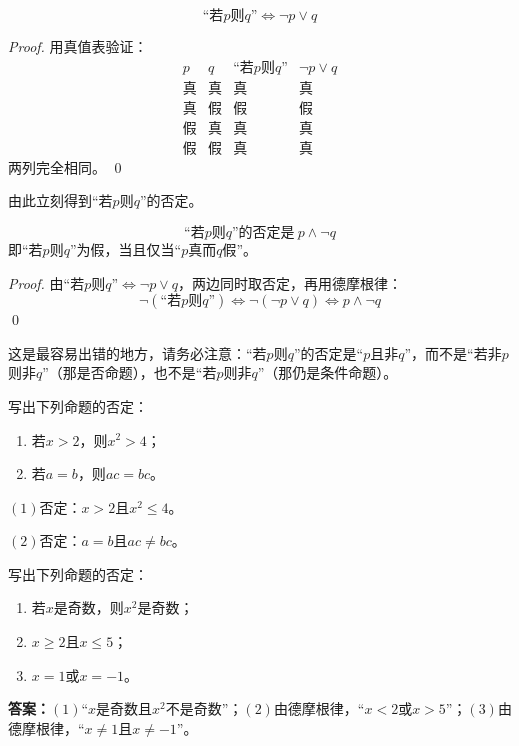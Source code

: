 \begin{theorem}[“若$p$则$q$”的改写]
\[
\text{“若}p\text{则}q\text{”}\iff \neg p\lor q
\]
\end{theorem}
\begin{proof}
用真值表验证：
\[
\begin{array}{c|c||c|c}
p & q & \text{“若}p\text{则}q\text{”} & \neg p\lor q\\\hline
\text{真} & \text{真} & \text{真} & \text{真}\\
\text{真} & \text{假} & \text{假} & \text{假}\\
\text{假} & \text{真} & \text{真} & \text{真}\\
\text{假} & \text{假} & \text{真} & \text{真}
\end{array}
\]
两列完全相同。
\qed
\end{proof}

由此立刻得到“若$p$则$q$”的否定。

\begin{corollary}[“若$p$则$q$”的否定]
\[
\text{“若}p\text{则}q\text{”的否定是}\ p\land\neg q
\]
即“若$p$则$q$”为假，当且仅当“$p$真而$q$假”。
\end{corollary}
\begin{proof}
由“若$p$则$q$”$\iff\neg p\lor q$，两边同时取否定，再用德摩根律：
\[\neg(\text{“若}p\text{则}q\text{”})\iff\neg(\neg p\lor q)\iff p\land\neg q\]
\qed
\end{proof}

这是最容易出错的地方，请务必注意：“若$p$则$q$”的否定是“$p$且非$q$”，而不是“若非$p$则非$q$”（那是否命题），也不是“若$p$则非$q$”（那仍是条件命题）。

\begin{example}
写出下列命题的否定：
\begin{enumerate}
    \item 若$x>2$，则$x^2>4$；
    \item 若$a=b$，则$ac=bc$。
\end{enumerate}
\end{example}
\begin{jie}
    $(1)$否定：$x>2$且$x^2\leq 4$。

    $(2)$否定：$a=b$且$ac\neq bc$。
\end{jie}

\begin{exercise}
写出下列命题的否定：
\begin{enumerate}
    \item 若$x$是奇数，则$x^2$是奇数；
    \item $x\geq 2$且$x\leq 5$；
    \item $x=1$或$x=-1$。
\end{enumerate}
\end{exercise}
\textbf{答案：}$(1)$“$x$是奇数且$x^2$不是奇数”；$(2)$由德摩根律，“$x<2$或$x>5$”；$(3)$由德摩根律，“$x\neq 1$且$x\neq -1$”。

